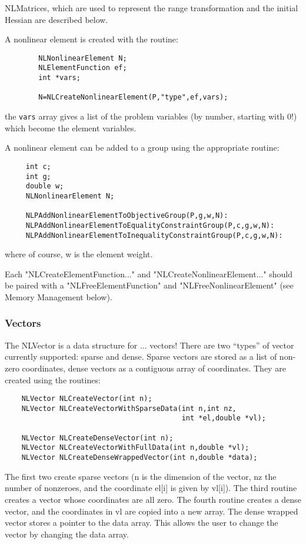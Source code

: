 \documentclass[12pt]{article}
\begin{document}
     NLMatrices, which are used to represent the range transformation and the initial Hessian are described below.

     A nonlinear element is created with the routine:
     \begin{verbatim}
        NLNonlinearElement N;
        NLElementFunction ef;
        int *vars;

        N=NLCreateNonlinearElement(P,"type",ef,vars);
     \end{verbatim}
     the {\tt vars} array gives a list of the problem variables (by number, starting with 0!) which become the
     element variables.

     A nonlinear element can be added to a group using the appropriate routine:
     \begin{verbatim}
     int c;
     int g;
     double w;
     NLNonlinearElement N;

     NLPAddNonlinearElementToObjectiveGroup(P,g,w,N):
     NLPAddNonlinearElementToEqualityConstraintGroup(P,c,g,w,N):
     NLPAddNonlinearElementToInequalityConstraintGroup(P,c,g,w,N):
     \end{verbatim}
     where of course, w is the element weight.

     Each "NLCreateElementFunction..." and "NLCreateNonlinearElement..." should be paired with a "NLFreeElementFunction" 
     and "NLFreeNonlinearElement" (see Memory Management below).

   \subsubsection{Vectors}

   The NLVector is a data structure for ... vectors! There are two ``types'' of vector currently supported: sparse and
   dense. Sparse vectors are stored as a list of non-zero coordinates, dense vectors as a contiguous array of coordinates.
   They are created using the routines:
   \begin{verbatim}
    NLVector NLCreateVector(int n);
    NLVector NLCreateVectorWithSparseData(int n,int nz,
                                          int *el,double *vl);

    NLVector NLCreateDenseVector(int n);
    NLVector NLCreateVectorWithFullData(int n,double *vl);
    NLVector NLCreateDenseWrappedVector(int n,double *data);
   \end{verbatim}
   The first two create sparse vectors (n is the dimension of the vector, nz the number of nonzeroes, and the
   coordinate el[i] is given by vl[i]). The third routine creates a vector whose coordinates are all zero.
   The fourth routine creates a dense vector, and the coordinates in vl are copied into a new array. The dense
   wrapped vector stores a pointer to the data array. This allows the user to change the vector by changing the
   data array.
\end{document}
